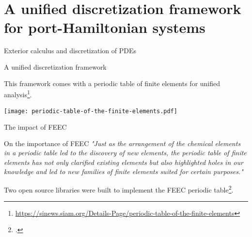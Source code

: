 \documentclass[aspectratio=169]{beamer}
\begin{document}
\section{A unified discretization framework for port-Hamiltonian systems}


\begin{frame}{Exterior calculus and discretization of PDEs}
	
\begin{block}{A unified discretization framework}
\end{block}

This framework comes with a periodic table of finite elements for unified analysis\footnote{\url{https://sinews.siam.org/Details-Page/periodic-table-of-the-finite-elements}}.

\centering
\texttt{[image: periodic-table-of-the-finite-elements.pdf]}
\end{frame}

\begin{frame}{The impact of FEEC}
		\begin{block}{On the importance of FEEC}
			\textit{"Just as the arrangement of the chemical elements in a periodic table led to the discovery of new elements, the periodic table of finite elements has not only clarified existing elements but also highlighted holes in our knowledge and led to new families of finite elements suited for certain purposes."}
		\end{block}
		Two open source libraries were built to implement the FEEC periodic table\footcite{logg2012,rathgeber2017firedrake}.

\end{frame}
\end{document}
